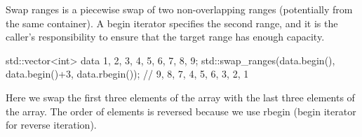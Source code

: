 Swap ranges is a piecewise swap of two non-overlapping ranges (potentially from the same container). A begin iterator specifies the second range, and it is the caller’s responsibility to ensure that the target range has enough capacity.


\begin{box-note}
\begin{cppcode}
std::vector<int> data{ 1, 2, 3, 4, 5, 6, 7, 8, 9};
std::swap_ranges(data.begin(), data.begin()+3, data.rbegin());
// 9, 8, 7, 4, 5, 6, 3, 2, 1
\end{cppcode}
\end{box-note}

Here we swap the first three elements of the array with the last three elements of the array. The order of elements is reversed because we use rbegin (begin iterator for reverse iteration).